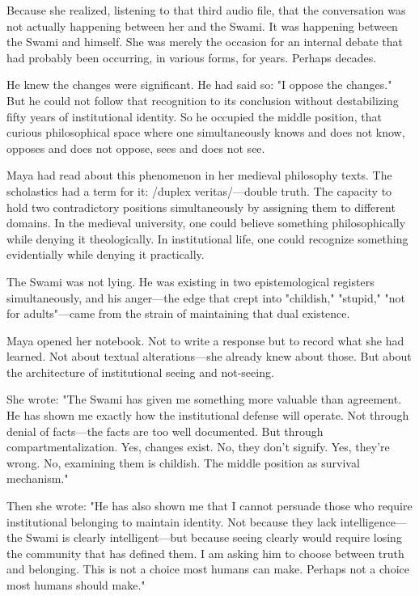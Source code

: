 \documentclass[12pt,twoside]{book}
\begin{document}
Because she realized, listening to that third audio file, that the conversation was not actually happening between her and the Swami. It was happening between the Swami and himself. She was merely the occasion for an internal debate that had probably been occurring, in various forms, for years. Perhaps decades.

He knew the changes were significant. He had said so: "I oppose the changes." But he could not follow that recognition to its conclusion without destabilizing fifty years of institutional identity. So he occupied the middle position, that curious philosophical space where one simultaneously knows and does not know, opposes and does not oppose, sees and does not see.

Maya had read about this phenomenon in her medieval philosophy texts. The scholastics had a term for it: /duplex veritas/—double truth. The capacity to hold two contradictory positions simultaneously by assigning them to different domains. In the medieval university, one could believe something philosophically while denying it theologically. In institutional life, one could recognize something evidentially while denying it practically.

The Swami was not lying. He was existing in two epistemological registers simultaneously, and his anger—the edge that crept into "childish," "stupid," "not for adults"—came from the strain of maintaining that dual existence.

Maya opened her notebook. Not to write a response but to record what she had learned. Not about textual alterations—she already knew about those. But about the architecture of institutional seeing and not-seeing.

She wrote: "The Swami has given me something more valuable than agreement. He has shown me exactly how the institutional defense will operate. Not through denial of facts—the facts are too well documented. But through compartmentalization. Yes, changes exist. No, they don't signify. Yes, they're wrong. No, examining them is childish. The middle position as survival mechanism."

Then she wrote: "He has also shown me that I cannot persuade those who require institutional belonging to maintain identity. Not because they lack intelligence—the Swami is clearly intelligent—but because seeing clearly would require losing the community that has defined them. I am asking him to choose between truth and belonging. This is not a choice most humans can make. Perhaps not a choice most humans should make."
\end{document}
